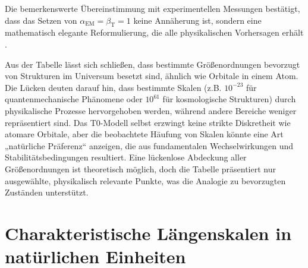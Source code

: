 \documentclass[12pt,a4paper]{article}
\newcommand{\alphaEM}{\alpha_{\text{EM}}}
\newcommand{\betaT}{\beta_{\text{T}}}
\begin{document}
	Die bemerkenswerte Übereinstimmung mit experimentellen Messungen bestätigt, dass das Setzen von $\alphaEM = \betaT = 1$ keine Annäherung ist, sondern eine mathematisch elegante Reformulierung, die alle physikalischen Vorhersagen erhält \cite{pascher_emergente_2025, pascher_alphabeta_2025}.
	
	Aus der Tabelle lässt sich schließen, dass bestimmte Größenordnungen bevorzugt von Strukturen im Universum besetzt sind, ähnlich wie Orbitale in einem Atom. Die Lücken deuten darauf hin, dass bestimmte Skalen (z.B. $10^{-23}$ für quantenmechanische Phänomene oder $10^{61}$ für kosmologische Strukturen) durch physikalische Prozesse hervorgehoben werden, während andere Bereiche weniger repräsentiert sind. Das T0-Modell selbst erzwingt keine strikte Diskretheit wie atomare Orbitale, aber die beobachtete Häufung von Skalen könnte eine Art „natürliche Präferenz“ anzeigen, die aus fundamentalen Wechselwirkungen und Stabilitätsbedingungen resultiert. Eine lückenlose Abdeckung aller Größenordnungen ist theoretisch möglich, doch die Tabelle präsentiert nur ausgewählte, physikalisch relevante Punkte, was die Analogie zu bevorzugten Zuständen unterstützt.
	\section{Charakteristische Längenskalen in natürlichen Einheiten}
	
\end{document}
